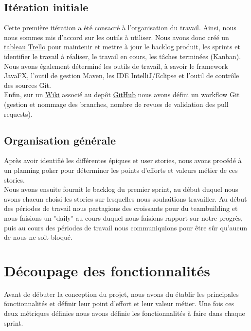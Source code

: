 \documentclass[10pt,a4paper]{article}
\begin{document}
\subsection{Itération initiale}
Cette première itération a été consacré à l'organisation du travail. Ainsi, nous nous sommes mis d'accord sur les outils à utiliser. Nous avons donc créé un \href{https://trello.com/b/HyinoLEE/navigateur}{\underline{tableau Trello}} pour maintenir et mettre à jour le backlog  produit, les sprints et identifier le travail à réaliser, le travail en cours, les tâches terminées (Kanban). \\ 
Nous avons également déterminé les outils de travail, à savoir le framework JavaFX, l'outil de gestion Maven, les IDE IntelliJ/Eclipse et l'outil de contrôle des sources Git. \\ 
Enfin, sur un \href{https://github.com/simjnd/navigateur/wiki}{\underline{Wiki}} associé au depôt \href{https://github.com/simjnd/navigateur}{\underline{GitHub}} nous avons défini un workflow Git (gestion et nommage des branches, nombre de revues de validation des pull requests). \\

\subsection{Organisation générale}

Après avoir identifié les différentes épiques et user stories, nous avons procédé à un planning poker pour déterminer les points d'efforts et valeurs métier de ces stories. \\
Nous avons ensuite fournit le backlog du premier sprint, au début duquel nous avons chacun choisi les stories sur lesquelles nous souhaitions travailler. Au début des périodes de travail nous partagions des croissants pour du teambuilding et nous faisions un "daily" au cours duquel nous faisions rapport sur notre progrès, puis au cours des périodes de travail nous communiquions pour être sûr qu'aucun de nous ne soit bloqué.

\newpage

\section{Découpage des fonctionnalités}
Avant de débuter la conception du projet, nous avons du établir les principales fonctionnalités et définir leur point d'effort et leur valeur métier. Une fois ces deux métriques définies nous avons définie les fonctionnalités à faire dans chaque sprint. 
\end{document}
